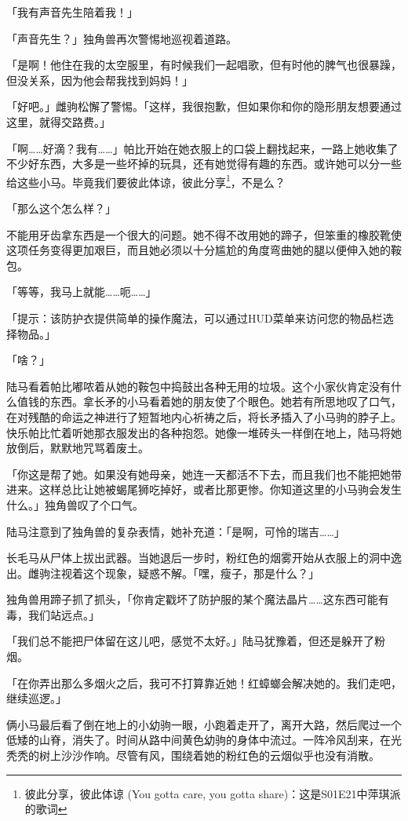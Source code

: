 「我有声音先生陪着我！」

「声音先生？」独角兽再次警惕地巡视着道路。

「是啊！他住在我的太空服里，有时候我们一起唱歌，但有时他的脾气也很暴躁，但没关系，因为他会帮我找到妈妈！」

「好吧。」雌驹松懈了警惕。「这样，我很抱歉，但如果你和你的隐形朋友想要通过这里，就得交路费。」

「啊……好滴？我有……」帕比开始在她衣服上的口袋上翻找起来，一路上她收集了不少好东西，大多是一些坏掉的玩具，还有她觉得有趣的东西。或许她可以分一些给这些小马。毕竟我们要彼此体谅，彼此分享\footnote{彼此分享，彼此体谅 (You gotta care, you gotta share)：这是S01E21中萍琪派的歌词}，不是么？

「那么这个怎么样？」

不能用牙齿拿东西是一个很大的问题。她不得不改用她的蹄子，但笨重的橡胶靴使这项任务变得更加艰巨，而且她必须以十分尴尬的角度弯曲她的腿以便伸入她的鞍包。

「等等，我马上就能……呃……」

「{\mt 提示：该防护衣提供简单的操作魔法，可以通过HUD菜单来访问您的物品栏选择物品。}」

「啥？」

陆马看着帕比嘟哝着从她的鞍包中捣鼓出各种无用的垃圾。这个小家伙肯定没有什么值钱的东西。拿长矛的小马看着她的朋友使了个眼色。她若有所思地叹了口气，在对残酷的命运之神进行了短暂地内心祈祷之后，将长矛插入了小马驹的脖子上。快乐帕比忙着听她那衣服发出的各种抱怨。她像一堆砖头一样倒在地上，陆马将她放倒后，默默地咒骂着废土。

「你这是帮了她。如果没有她母亲，她连一天都活不下去，而且我们也不能把她带进来。这样总比让她被蝎尾狮吃掉好，或者比那更惨。你知道这里的小马驹会发生什么。」独角兽叹了个口气。

陆马注意到了独角兽的复杂表情，她补充道：「是啊，可怜的瑞吉……」

长毛马从尸体上拔出武器。当她退后一步时，粉红色的烟雾开始从衣服上的洞中逸出。雌驹注视着这个现象，疑惑不解。「嘿，瘦子，那是什么？」

独角兽用蹄子抓了抓头，「你肯定戳坏了防护服的某个魔法晶片……这东西可能有毒，我们站远点。」

「我们总不能把尸体留在这儿吧，感觉不太好。」陆马犹豫着，但还是躲开了粉烟。

「在你弄出那么多烟火之后，我可不打算靠近她！红蟑螂会解决她的。我们走吧，继续巡逻。」

俩小马最后看了倒在地上的小幼驹一眼，小跑着走开了，离开大路，然后爬过一个低矮的山脊，消失了。时间从路中间黄色幼驹的身体中流过。一阵冷风刮来，在光秃秃的树上沙沙作响。尽管有风，围绕着她的粉红色的云烟似乎也没有消散。

